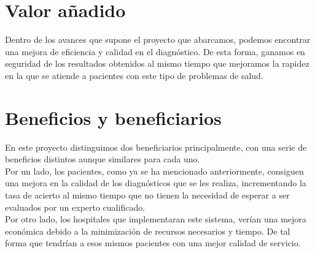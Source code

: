 \section{Valor añadido}

Dentro de los avances que supone el proyecto que abarcamos, podemos encontrar una mejora de eficiencia y calidad en el diagnóstico. De esta forma, ganamos en seguridad de los resultados obtenidos al mismo tiempo que mejoramos la rapidez en la que se atiende a pacientes con este tipo de problemas de salud.

\section{Beneficios y beneficiarios}

En este proyecto distinguimos dos beneficiarios principalmente, con una serie de beneficios distintos aunque similares para cada uno. \\

Por un lado, los pacientes, como ya se ha mencionado anteriormente, consiguen una mejora en la calidad de los diagnósticos que se les realiza, incrementando la tasa de acierto al mismo tiempo que no tienen la necesidad de esperar a ser evaluados por un experto cualificado. \\

Por otro lado, los hospitales que implementaran este sistema, verían una mejora económica debido a la minimización de recursos necesarios y tiempo. De tal forma que tendrían a esos mismos pacientes con una mejor calidad de servicio.






       
